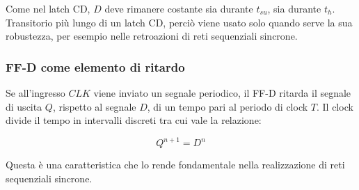 \documentclass{article}
\begin{document}
\noindent
Come nel latch CD, $D$ deve rimanere costante sia durante $t_{su}$, sia durante $t_h$.
Transitorio più lungo di un latch CD, perciò viene usato solo quando serve la sua robustezza, per esempio nelle retroazioni di reti sequenziali sincrone.

\subsubsection{FF-D come elemento di ritardo}

Se all'ingresso $CLK$ viene inviato un segnale periodico, il FF-D ritarda il segnale di uscita $Q$, rispetto al segnale $D$, di un tempo pari al periodo di clock $T$.
Il clock divide il tempo in intervalli discreti tra cui vale la relazione:

$$
Q^{n+1} = D^{n}
$$

\noindent
Questa è una caratteristica che lo rende fondamentale nella realizzazione di reti sequenziali sincrone.
\end{document}
